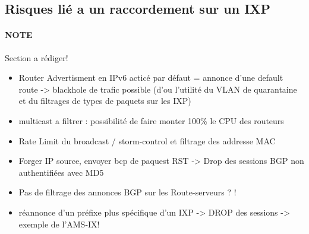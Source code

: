 \subsection{Risques lié a un raccordement sur un IXP}

\paragraph{NOTE} Section a rédiger!
\begin{itemize}
\item Router Advertisment en IPv6 acticé par défaut = annonce d'une default route -> blackhole de trafic possible (d'ou l'utilité du VLAN de quarantaine et du filtrages de types de paquets sur les IXP)
\item multicast a filtrer : possibilité de faire monter 100\% le CPU des routeurs
\item Rate Limit du broadcast / storm-control et filtrage des addresse MAC
\item Forger IP source, envoyer bcp de paquest RST -> Drop des sessions BGP non authentifiées avec MD5
\item Pas de filtrage des annonces BGP sur les Route-serveurs ? ! 
\item réannonce d'un préfixe plus spécifique d'un IXP -> DROP des sessions -> exemple de l'AMS-IX!
\end{itemize}


